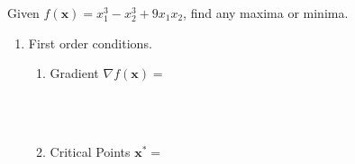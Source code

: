 \documentclass[]{book}
\theoremstyle{definition}
\theoremstyle{definition}
\theoremstyle{definition}
\theoremstyle{remark}
\begin{document}
\protect\hypertarget{exr:unnamed-chunk-59}{}{\label{exr:unnamed-chunk-59} }Given \(f(\mathbf{x})=x_1^3-x_2^3+9x_1x_2\), find any maxima or minima.

\begin{enumerate}
  \item First order conditions.  
    \begin{enumerate}
    \item Gradient $\nabla f(\mathbf{x}) = $
        $$\phantom{\begin{pmatrix} \frac{\partial f}{\partial x_1} \\ 
        \frac{\partial f}{\partial x_2}\end{pmatrix} =
        \begin{pmatrix} 3x_1^2+9x_2 \\ -3x_2^2+9x_1 \end{pmatrix}}$$
    \item Critical Points $\mathbf{x^*} =$\\
        $$\phantom{3x_1^2 + 9x_2 = 0 \quad \Rightarrow \quad  9x_2 = 
        -3x_1^2 \quad \Rightarrow \quad  x_2 = -\frac{1}{3}x_1^2}$$
        $$\phantom{-3x_2^2 + 9x_1 = 0 \quad \Rightarrow \quad 
        -3(-\frac{1} {3}x_1^2)^2 + 9x_1 = 0}$$ 
        $$\phantom{\Rightarrow \quad -\frac{1}{3}x_1^4 
        + 9x_1 = 0 \quad \Rightarrow \quad x_1^3 = 27x_1 \quad 
        \Rightarrow \quad x_1 = 3}$$
        $$\phantom{3(3)^2 + 9x_2 = 0 \quad \Rightarrow \quad x_2 = -3}$$    
    \end{enumerate}       
 

\end{enumerate}
\end{document}
